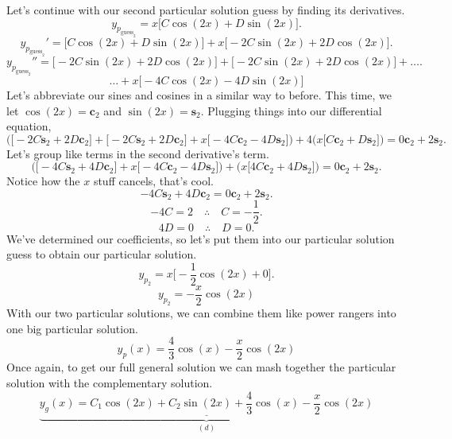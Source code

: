 \documentclass[a4paper,12pt]{article}
\begin{document}
Let's continue with our second particular solution guess by finding its derivatives.
$$ y_{p_{\text{guess}_2}} = x\bigg[C\cos{(2x)} + D\sin{(2x)}\bigg]. $$
$$ y_{p_{\text{guess}_2}}' = \bigg[C\cos{(2x)} + D\sin{(2x)}\bigg] + x\bigg[-2C\sin{(2x)} + 2D\cos{(2x)}\bigg]. $$
$$ y_{p_{\text{guess}_2}}'' = \bigg[-2C\sin{(2x)} + 2D\cos{(2x)}\bigg] + \bigg[-2C\sin{(2x)} + 2D\cos{(2x)}\bigg] +\ldots. $$
$$ \ldots+x\bigg[-4C\cos{(2x)} - 4D\sin{(2x)}\bigg] $$
Let's abbreviate our sines and cosines in a similar way to before. This time, we let $\cos{(2x)} = \textbf{c}_2$ and $\sin{(2x)} = \textbf{s}_2$. Plugging things into our differential equation,
$$ \bigg(\big[-2C\textbf{s}_2 + 2D\textbf{c}_2\big] + \big[-2C\textbf{s}_2 + 2D\textbf{c}_2\big] + x\big[-4C\textbf{c}_2 - 4D\textbf{s}_2\big]  \bigg) + 4\bigg(x\big[C\textbf{c}_2 + D\textbf{s}_2\big]\bigg) = 0\textbf{c}_2 + 2\textbf{s}_2. $$
Let's group like terms in the second derivative's term.
$$ \bigg(\big[-4C\textbf{s}_2 + 4D\textbf{c}_2\big] + x\big[-4C\textbf{c}_2 - 4D\textbf{s}_2\big]\bigg) + \bigg(x\big[4C\textbf{c}_2 + 4D\textbf{s}_2\big]\bigg) = 0\textbf{c}_2 + 2\textbf{s}_2 .$$
Notice how the $x$ stuff cancels, that's cool.
$$ -4C\textbf{s}_2 + 4D\textbf{c}_2 = 0\textbf{c}_2 + 2\textbf{s}_2. $$
$$ -4C = 2 \quad\therefore\quad C = -\frac{1}{2}. $$
$$ 4D = 0 \quad\therefore\quad D = 0. $$
We've determined our coefficients, so let's put them into our particular solution guess to obtain our particular solution.
$$ y_{p_2} = x\bigg[-\frac{1}{2}\cos{(2x)} + 0\bigg]. $$
$$ \boxed{y_{p_2} = -\frac{x}{2}\cos{(2x)}} $$
With our two particular solutions, we can combine them like power rangers into one big particular solution.
$$ \boxed{y_p(x) = \frac{4}{3}\cos{(x)} - \frac{x}{2}\cos{(2x)}} $$
Once again, to get our full general solution we can mash together the particular solution with the complementary solution.
$$ \underbrace{\underline{\boxed{y_g(x) = C_1\cos{(2x)} + C_{2}\sin{(2x)} + \frac{4}{3}\cos{(x)} - \frac{x}{2}\cos{(2x)}}}}_{(d)}$$
\end{document}
